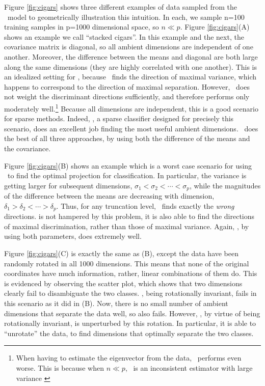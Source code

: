 \documentclass[10pt]{article}
\begin{document}
Figure \ref{fig:cigars} shows three different examples of data sampled from the \Lda~model to geometrically illustration this intuition.
In each, we sample n=100 training samples in p=1000 dimensional space, so $n \ll p$.  
Figure \ref{fig:cigars}(A) shows an example we call  ``stacked cigars''. 
In this example and the next, the covariance matrix is diagonal, so all ambient dimensions are independent of one another.  
Moreover,  the difference between the means and diagonal are both large along the same dimensions (they are highly correlated with one another). 
This is an idealized setting for \Pca, because \Pca~finds the direction of maximal variance, which happens to correspond to the direction of maximal separation.  
However, \Pca~does not weight the discriminant directions sufficiently, and therefore performs only moderately well.\footnote{When having to estimate the eigenvector from the data, \Pca~performs even worse.  This is because when $n \ll p$, \Pca~is an inconsistent estimator with large variance \cite{Baik2006a,Paul2007a}}
Because all dimensions are independent, this is a good scenario for sparse methods.  
Indeed,  , a sparse classifier designed for precisely this scenario,  does an excellent job finding the most useful ambient dimensions.  
\Lol~does the best of all three approaches, by using both the difference of the means and the covariance.


Figure \ref{fig:cigars}(B) shows an example which is a worst case scenario for using \Pca~to find the optimal projection for classification.  
In particular, the variance is getting larger for subsequent dimensions, $\sigma_1 < \sigma_2 < \cdots < \sigma_p$, while the magnitudes of the difference between the means are decreasing with dimension, $\delta_1 > \delta_2 < \cdots > \delta_p$. 
Thus, for any truncation level,  \Pca~finds exactly the \emph{wrong} directions.  
 is not hampered by this problem, it is also able to find the directions of maximal discrimination, rather than those of maximal variance.
Again, \Lol, by using both parameters, does extremely well.


Figure \ref{fig:cigars}(C) is exactly the same as (B), except the data have been randomly rotated in all 1000 dimensions.  This means that none of the original coordinates have much information, rather, linear combinations of them do.  
This is evidenced by observing the scatter plot, which shows that two dimensions clearly fail to disambiguate the two classes.
\Pca, being rotationally invariant, fails in this scenario as it did in (B).
Now, there is no small number of ambient dimensions that separate the data well, so  also fails.
However, \Lol, by virtue of being rotationally invariant, is unperturbed by this rotation.  In particular, it is able to ``unrotate'' the data, to find dimensions that optimally separate the two classes.  
\end{document}
